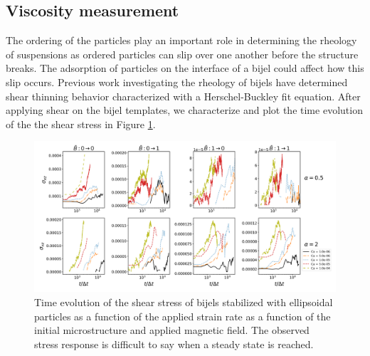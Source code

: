\subsection{Viscosity measurement}

The ordering of the particles play an important role in determining the rheology of suspensions as ordered particles can slip over one another
before the structure breaks. The adsorption of particles on the interface of a bijel could affect how this slip occurs. Previous work investigating
the rheology of bijels have determined shear thinning behavior characterized with a Herschel-Buckley fit equation. \cite{macmillan_rheological_2019} 
After applying shear on the bijel templates, we characterize and plot the time evolution of the the shear stress in Figure \ref{fig:stress_time}.

\begin{figure} 
    \centering 
    \includegraphics[scale=0.3]{../figures/results/paper3/stress-time_compare.png} 
    \caption{Time evolution of the shear stress of bijels stabilized with ellipsoidal particles as a function of the applied strain rate as
             a function of the initial microstructure and applied magnetic field. The observed stress response is difficult to say when a steady
             state is reached.} 
    \label{fig:stress_time} 
\end{figure}

